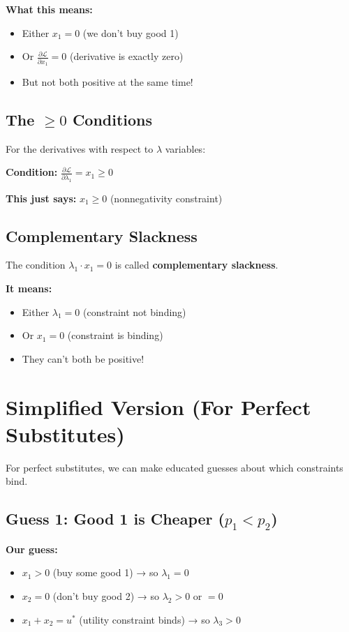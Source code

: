 \documentclass[11pt]{article}
\begin{document}
\textbf{What this means:}
\begin{itemize}
\item Either $x_1 = 0$ (we don't buy good 1)
\item Or $\frac{\partial \mathcal{L}}{\partial x_1} = 0$ (derivative is exactly zero)
\item But not both positive at the same time!
\end{itemize}

\subsection{The $\geq 0$ Conditions}

For the derivatives with respect to $\lambda$ variables:

\textbf{Condition:} $\frac{\partial \mathcal{L}}{\partial \lambda_1} = x_1 \geq 0$

\textbf{This just says:} $x_1 \geq 0$ (nonnegativity constraint)

\subsection{Complementary Slackness}

The condition $\lambda_1 \cdot x_1 = 0$ is called \textbf{complementary slackness}.

\textbf{It means:}
\begin{itemize}
\item Either $\lambda_1 = 0$ (constraint not binding)
\item Or $x_1 = 0$ (constraint is binding)
\item They can't both be positive!
\end{itemize}

\section{Simplified Version (For Perfect Substitutes)}

For perfect substitutes, we can make educated guesses about which constraints bind.

\subsection{Guess 1: Good 1 is Cheaper ($p_1 < p_2$)}

\textbf{Our guess:}
\begin{itemize}
\item $x_1 > 0$ (buy some good 1) → so $\lambda_1 = 0$
\item $x_2 = 0$ (don't buy good 2) → so $\lambda_2 > 0$ or $= 0$
\item $x_1 + x_2 = u^*$ (utility constraint binds) → so $\lambda_3 > 0$
\end{itemize}
\end{document}
